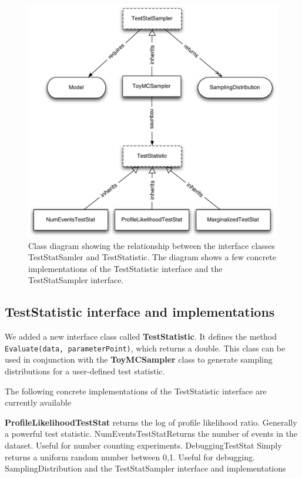 \documentclass[11pt]{article}
\begin{document}
\begin{figure}[htbp]
\begin{center}
\includegraphics[width=\textwidth]{RooStats_TestStatistic.pdf}
\caption{Class diagram showing the relationship between the interface classes TestStatSamler and TestStatistic.  The diagram shows a few concrete implementations of the TestStatistic interface and the TestStatSampler interface.}
\label{fig:TestStatistic}
\end{center}
\end{figure}

	\subsection{TestStatistic interface and implementations}


We added a new interface class called \textbf{TestStatistic}. It defines the method \texttt{Evaluate(data, parameterPoint)}, which returns a double.  This class can be used in conjunction with the \textbf{ToyMCSampler} class to generate sampling distributions for a user-defined test statistic.  

The following concrete implementations of the TestStatistic interface are currently available

\textbf{ProfileLikelihoodTestStat} returns the log of profile likelihood ratio.  Generally a powerful test statistic.
NumEventsTestStatReturns the number of events in the dataset.  Useful for number counting experiments.
DebuggingTestStat Simply returns a uniform random number between 0,1.  Useful for debugging.
SamplingDistribution and the TestStatSampler interface and implementations
\end{document}

